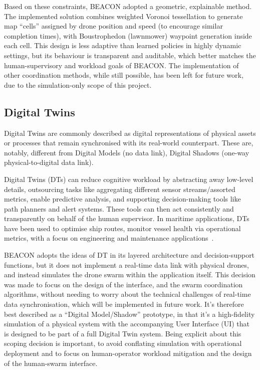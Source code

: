 Based on these constraints, BEACON adopted a geometric, explainable method.
The implemented solution combines weighted Voronoi tessellation to generate map ``cells'' assigned by drone position and speed (to encourage similar completion times), with Boustrophedon (lawnmower) waypoint generation inside each cell.
This design is less adaptive than learned policies in highly dynamic settings, but its behaviour is transparent and auditable, which better matches the human-supervisory and workload goals of BEACON\@.
The implementation of other coordination methods, while still possible, has been left for future work, due to the simulation-only scope of this project.

\subsection{Digital Twins}\label{subsec:digital-twins}
Digital Twins are commonly described as digital representations of physical assets or processes that remain synchronised with its real-world counterpart.
These are, notably, different from Digital Models (no data link), Digital Shadows (one-way physical-to-digital data link).

Digital Twins (DTs) can reduce cognitive workload by abstracting away low-level details, outsourcing tasks like aggregating different sensor streams/assorted metrics, enable predictive analysis, and supporting decision-making tools like path planners and alert systems.
These tools can then act consistently and transparently on behalf of the human supervisor.
In maritime applications, DTs have been used to optimise ship routes, monitor vessel health via operational metrics, with a focus on engineering and maintenance applications~\cite{DT_maritime_applications}.

BEACON adopts the ideas of DT in its layered architecture and decision-support functions, but it does not implement a real-time data link with physical drones, and instead simulates the drone swarm within the application itself.
This decision was made to focus on the design of the interface, and the swarm coordination algorithms, without needing to worry about the technical challenges of real-time data synchronisation, which will be implemented in future work.
It's therefore best described as a ``Digital Model/Shadow'' prototype, in that it's a high-fidelity simulation of a physical system with the accompanying User Interface (UI) that is designed to be part of a full Digital Twin system.
Being explicit about this scoping decision is important, to avoid conflating simulation with operational deployment and to focus on human-operator workload mitigation and the design of the human-swarm interface.

